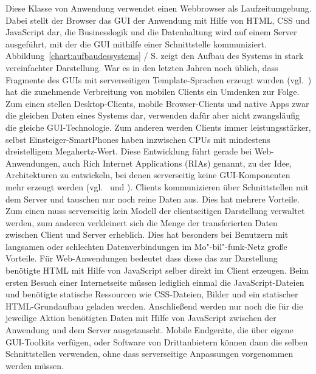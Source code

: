 Diese Klasse von Anwendung verwendet einen Webbrowser als Laufzeitumgebung. Dabei stellt der Browser das GUI der Anwendung mit Hilfe von HTML, CSS und JavaScript dar, die Businesslogik und die Datenhaltung wird auf einem Server ausgeführt, mit der die GUI mithilfe einer Schnittstelle kommuniziert. Abbildung~\ref{chart:aufbaudessystems} / S.\pageref{chart:aufbaudessystems} zeigt den Aufbau des Systems in stark vereinfachter Darstellung. War es in den letzten Jahren noch üblich, dass Fragmente des GUIs mit serverseitigen Template-Sprachen erzeugt wurden (vgl.~\cite[S.48]{dunkel2008systemarchitekturen}) hat die zunehmende Verbreitung von mobilen Clients ein Umdenken zur Folge. Zum einen stellen Desktop-Clients, mobile Browser-Clients und native Apps zwar die gleichen Daten eines Systems dar, verwenden dafür aber nicht zwangsläufig die gleiche GUI-Technologie. Zum anderen werden Clients immer leistungsstärker, selbst Einsteiger-SmartPhones haben inzwischen CPUs mit mindestens dreistelligem Megahertz-Wert. Diese Entwicklung führt gerade bei Web-Anwendungen, auch Rich Internet Applications (RIAs) genannt, zu der Idee, Architekturen zu entwickeln, bei denen serverseitig keine GUI-Komponenten mehr erzeugt werden (vgl.~\cite{maccaw2011javascript} und \cite{coates2012phptemplating}). Clients kommunizieren über Schnittstellen mit dem Server und tauschen nur noch reine Daten aus. Dies hat mehrere Vorteile. Zum einen muss serverseitig kein Modell der clientseitigen Darstellung verwaltet werden, zum anderen verkleinert sich die Menge der transferierten Daten zwischen Client und Server erheblich. Dies hat besonders bei Benutzern mit langsamen oder schlechten Datenverbindungen im Mo"-bil"-funk-Netz große Vorteile. Für Web-Anwendungen bedeutet dass diese das zur Darstellung benötigte HTML mit Hilfe von JavaScript selber direkt im Client erzeugen. Beim ersten Besuch einer Internetseite müssen lediglich einmal die JavaScript-Dateien und benötigte statische Ressourcen wie CSS-Dateien, Bilder und ein statischer HTML-Grundaufbau geladen werden. Anschließend werden nur noch die für die jeweilige Aktion benötigten Daten mit Hilfe von JavaScript zwischen der Anwendung und dem Server ausgetauscht. Mobile Endgeräte, die über eigene GUI-Toolkits verfügen, oder Software von Drittanbietern können dann die selben Schnittstellen verwenden, ohne dass serverseitige Anpassungen vorgenommen werden müssen.

